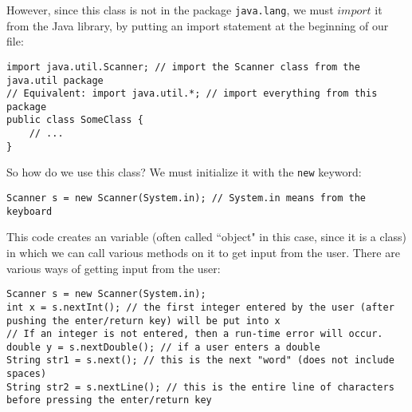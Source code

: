 \par However, since this class is not in the package \verb|java.lang|, we must $import$ it from the Java library, by putting an import statement at the beginning of our file:
\begin{lstlisting}
import java.util.Scanner; // import the Scanner class from the java.util package
// Equivalent: import java.util.*; // import everything from this package
public class SomeClass {
	// ...
}
\end{lstlisting}

\noindent So how do we use this class? We must initialize it with the \verb|new| keyword:
\begin{lstlisting}
Scanner s = new Scanner(System.in); // System.in means from the keyboard
\end{lstlisting}
\noindent This code creates an variable (often called ``object" in this case, since it is a class) in which we can call various methods on it to get input from the user. There are various ways of getting input from the user:

\begin{lstlisting}
Scanner s = new Scanner(System.in);
int x = s.nextInt(); // the first integer entered by the user (after pushing the enter/return key) will be put into x
// If an integer is not entered, then a run-time error will occur.
double y = s.nextDouble(); // if a user enters a double
String str1 = s.next(); // this is the next "word" (does not include spaces)
String str2 = s.nextLine(); // this is the entire line of characters before pressing the enter/return key
\end{lstlisting}


